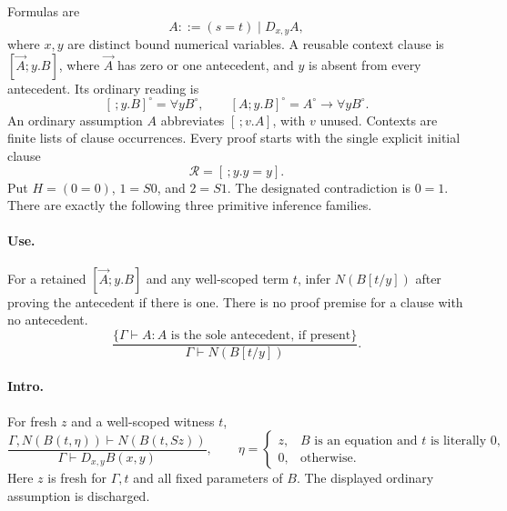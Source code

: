\documentclass[11pt,a4paper]{article}
\theoremstyle{definition}\newtheorem{definition}[theorem]{Definition}
\theoremstyle{remark}\newtheorem{remark}[theorem]{Remark}
\begin{document}
Formulas are
\[
 A ::= (s=t)\mid D_{x,y}A,
\]
where $x,y$ are distinct bound numerical variables. A reusable context
clause is $[\vec A;y.B]$, where $\vec A$ has zero or one antecedent,
and $y$ is absent from every antecedent. Its ordinary reading is
\[
 [\,;y.B]^\circ=\forall y B^\circ,
 \qquad [A;y.B]^\circ=A^\circ\to\forall y B^\circ.
\]
An ordinary assumption $A$ abbreviates $[\,;v.A]$, with $v$ unused.
Contexts are finite lists of clause occurrences. Every proof starts with
the single explicit initial clause
\[
                 \mathcal R=[\,;y.y=y]. \tag{Ax}
\]
Put $H=(0=0)$, $1=S0$, and $2=S1$. The designated contradiction is $0=1$.
There are exactly the following three primitive inference families.

\paragraph{Use.}
For a retained $[\vec A;y.B]$ and any well-scoped term $t$, infer $N(B[t/y])$
after proving the antecedent if there is one. There is no proof premise
for a clause with no antecedent.
\[
 \frac{\{\Gamma\vdash A:A\text{ is the sole antecedent, if present}\}}
      {\Gamma\vdash N(B[t/y])}.
 \tag{Use}
\]

\paragraph{Intro.}
For fresh $z$ and a well-scoped witness $t$,
\[
 \frac{\Gamma,N(B(t,\eta))\vdash N(B(t,Sz))}
      {\Gamma\vdash D_{x,y}B(x,y)},
 \qquad
 \eta=\begin{cases}
 z,& B\text{ is an equation and }t\text{ is literally }0,\\
 0,&\text{otherwise}.
 \end{cases}
 \tag{Intro}
\]
Here $z$ is fresh for $\Gamma,t$ and all fixed parameters of $B$.
The displayed ordinary assumption is discharged.
\end{document}
